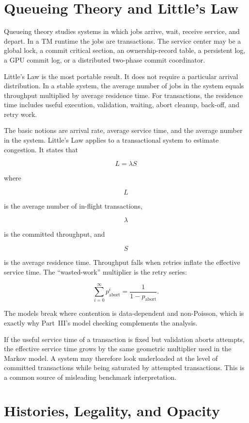 \section{Queueing Theory and Little's Law}

Queueing theory studies systems in which jobs arrive, wait, receive service, and depart. In a TM runtime the jobs are transactions. The service center may be a global lock, a commit critical section, an ownership-record table, a persistent log, a GPU commit log, or a distributed two-phase commit coordinator.

Little's Law is the most portable result. It does not require a particular arrival distribution. In a stable system, the average number of jobs in the system equals throughput multiplied by average residence time. For transactions, the residence time includes useful execution, validation, waiting, abort cleanup, back-off, and retry work.

The basic notions are arrival rate, average service time, and the average number in the system. Little's Law applies to a transactional system to estimate congestion. It states that

$$
L = \lambda S
$$

where

$$
L
$$

is the average number of in-flight transactions,

$$
\lambda
$$

is the committed throughput, and

$$
S
$$

is the average residence time. Throughput falls when retries inflate the effective service time. The ``wasted-work'' multiplier is the retry series:

$$
\sum_{i=0}^{\infty} p_{\mathrm{abort}}^i
  =
\frac{1}{1-p_{\mathrm{abort}}}.
$$

The models break where contention is data-dependent and non-Poisson, which is exactly why Part~III's model checking complements the analysis.

If the useful service time of a transaction is fixed but validation aborts attempts, the effective service time grows by the same geometric multiplier used in the Markov model. A system may therefore look underloaded at the level of committed transactions while being saturated by attempted transactions. This is a common source of misleading benchmark interpretation.

\section{Histories, Legality, and Opacity}
\label{sec:histories-legality-opacity}

